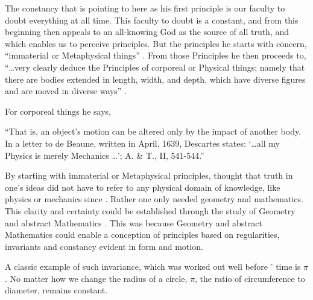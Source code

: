 \documentclass[a4paper, 12pt]{article}
\begin{document}
The constancy that \citeauthor{descartes_principles_1982} is pointing to here as his first principle is our faculty to doubt everything at all time. This faculty to doubt is a constant, and from this beginning \citeauthor{descartes_principles_1982} then appeals to an all-knowing God as the source of all truth, and which enables us to perceive principles. But the principles he starts with concern, ``immaterial or Metaphysical things'' \citeyearpar[p.~xxii]{descartes_principles_1982}. From those Principles he then proceeds to, ``\dots very clearly deduce the Principles of corporeal or Physical things; namely that there are bodies extended in length, width, and depth, which have diverse figures and are moved in diverse ways'' \citeyearpar[p.~xxii]{descartes_principles_1982}. 

For corporeal things he says, 

``That is, an object's motion can be altered only by the impact of another body. In a letter to de Beaune, written in April, 1639, Descartes states: `\dots all my Physics is merely Mechanics \dots'; A. \& T., II, 541-544.'' \citep[Miller and Miller in Fn.~14, p.~52]{descartes_principles_1982}


By starting with immaterial or Metaphysical principles, \citeauthor{descartes_principles_1982} thought that truth in one's ideas did not have to refer to any physical domain of knowledge, like physics or mechanics since \citep[p.~xvii]{descartes_principles_1982}. Rather one only needed geometry and mathematics. This clarity and certainty could be established through the study of Geometry and abstract Mathematics \citep[Part~II, Principle~64, p.~76]{descartes_principles_1982}. This was because Geometry and abstract Mathematics could enable a conception of principles based on regularities, invariants and constancy evident in form and motion. 

A classic example of such invariance, which was worked out well before \citeauthor{descartes_principles_1982}' time is \(\pi\). No matter how we change the radius of a circle, \(\pi\), the ratio of circumference to diameter, remains constant. 
\end{document}
